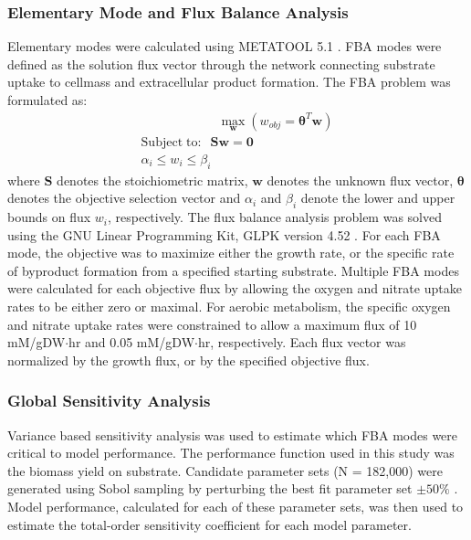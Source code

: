 \documentclass[10pt,twocolumn,twoside,final]{IEEEtran}
\begin{document}
\noindent\subsubsection*{Elementary Mode and Flux Balance Analysis}
Elementary modes were calculated using METATOOL 5.1 \cite{2006_vonKamp_Metatool}.
FBA modes were defined as the solution flux vector through the network connecting substrate uptake to cellmass and extracellular product formation.
The FBA problem was formulated as:
\begin{equation}
 \begin{multlined}
	\qquad \qquad \qquad \max_{\boldsymbol{w}}{} \! \left( w_{obj} = \mathbf{\theta}^T \boldsymbol{w} \right) \\
	\mathrm{Subject \; to:}
	 \; \; \mathbf{S}\mathbf{w}=\mathbf{0} \\
\alpha_i \leq w_i \leq \beta_i  \qquad
 \end{multlined}
\end{equation}
where $\mathbf{S}$ denotes the stoichiometric matrix, $\mathbf{w}$ denotes the unknown flux vector, $\boldsymbol{\theta}$ denotes the objective selection vector
and $\alpha_i$ and $\beta_i$ denote the lower and upper bounds on flux $w_{i}$, respectively.
The flux balance analysis problem was solved using the GNU Linear Programming Kit, GLPK version 4.52 \cite{GLPK}.
For each FBA mode, the objective was to maximize either the growth rate, or the specific rate of byproduct formation from a specified starting substrate.
Multiple FBA modes were calculated for each objective flux by allowing the oxygen and nitrate uptake rates to be either zero or maximal.
For aerobic metabolism, the specific oxygen and nitrate uptake rates were constrained to allow a maximum flux of 10 mM/gDW$\cdot$hr and 0.05 mM/gDW$\cdot$hr, respectively.
Each flux vector was normalized by the growth flux, or by the specified objective flux.

\subsubsection*{Global Sensitivity Analysis}
Variance based sensitivity analysis was used to estimate which FBA modes were critical to model performance.
The performance function used in this study was the biomass yield on substrate.
Candidate parameter sets (N = 182,000) were generated using Sobol sampling by perturbing the best fit parameter set $\pm50\%$ \cite{SALib}.
Model performance, calculated for each of these parameter sets, was then used to estimate the total-order sensitivity coefficient for each model parameter.
\end{document}
